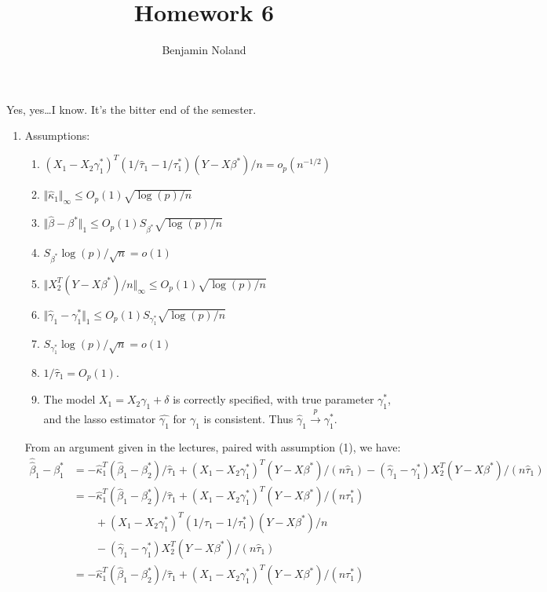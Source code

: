\documentclass[12pt]{article}
\title{Homework 6}
\author{Benjamin Noland}
\date{}
\begin{document}
\maketitle

Yes, yes\ldots I know. It's the bitter end of the semester.

\begin{enumerate}
\item
Assumptions:
\begin{enumerate}[label=(\arabic*)]
\item
$(X_1 - X_2\gamma^*_1)^T(1 / \hat{\tau}_1 - 1 / \tau^*_1)(Y - X\beta^*)/n = o_p(n^{-1/2})$
\item
$\Vert \hat{\kappa}_1 \Vert_\infty \leq O_p(1)\sqrt{\log(p)/n}$
\item
$\Vert \hat{\beta} - \beta^* \Vert_1 \leq O_p(1) S_{\beta^*} \sqrt{\log(p)/n}$
\item
$S_{\beta^*} \log(p)/\sqrt{n} = o(1)$
\item
$\Vert X_2^T(Y - X\beta^*)/n \Vert_\infty \leq O_p(1)\sqrt{\log(p)/n}$
\item
$\Vert \hat{\gamma}_1 - \gamma^*_1 \Vert_1 \leq O_p(1) S_{\gamma^*_1} \sqrt{\log(p)/n}$
\item
$S_{\gamma^*_1} \log(p) / \sqrt{n} = o(1)$
\item
$1 / \hat{\tau}_1 = O_p(1)$.
\item
The model $X_1 = X_2\gamma_1 + \delta$ is correctly specified, with true parameter $\gamma^*_1$, and the lasso estimator $\hat{\gamma_1}$ for $\gamma_1$ is consistent. Thus $\hat{\gamma}_1 \overset{p}\to \gamma^*_1$.
\end{enumerate}
From an argument given in the lectures, paired with assumption (1), we have:
\begin{align*}
\hat{\hat{\beta}}_1 - \beta^*_1 &= -\hat{\kappa}_1^T (\hat{\beta}_1 - \beta^*_2) / \hat{\tau}_1 + (X_1 - X_2\gamma^*_1)^T (Y - X\beta^*) / (n\hat{\tau}_1) - (\hat{\gamma}_1 - \gamma^*_1) X_2^T (Y - X\beta^*) / (n\hat{\tau}_1) \\
&= -\hat{\kappa}_1^T (\hat{\beta}_1 - \beta^*_2) / \hat{\tau}_1 + (X_1 - X_2\gamma^*_1)^T (Y - X\beta^*) / (n\tau^*_1) \\
&\qquad+ (X_1 - X_2\gamma^*_1)^T(1 / \hat{\tau}_1 - 1 / \tau^*_1)(Y - X\beta^*)/n \\
&\qquad- (\hat{\gamma}_1 - \gamma^*_1) X_2^T (Y - X\beta^*) / (n\hat{\tau}_1) \\
&= -\hat{\kappa}_1^T (\hat{\beta}_1 - \beta^*_2) / \hat{\tau}_1 + (X_1 - X_2\gamma^*_1)^T (Y - X\beta^*) / (n\tau^*_1) \\

\end{align*}
\end{enumerate}
\end{document}
